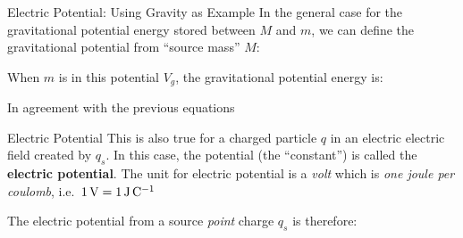 \documentclass[12pt,aspectratio=169]{beamer}
\begin{document}
\begin{frame}{Electric Potential: Using Gravity as Example}
  In the general case for the gravitational potential energy stored between
  $M$ and $m$, we can define the gravitational potential from ``source mass''
  $M$:
  

  When $m$ is in this potential $V_g$, the gravitational potential energy is:


  In agreement with the previous equations
\end{frame}



\begin{frame}{Electric Potential}
  This is also true for a charged particle $q$ in an electric electric field
  created by $q_s$. In this case, the potential (the ``constant'') is called the
  \textbf{electric potential}. The unit for electric potential is a \emph{volt}
  which is \emph{one joule per coulomb}, i.e.\
  $\SI1\volt=\SI1{\joule\per\coulomb}$


  The electric potential from a source \emph{point} charge $q_s$ is therefore:

\end{frame}
\end{document}

